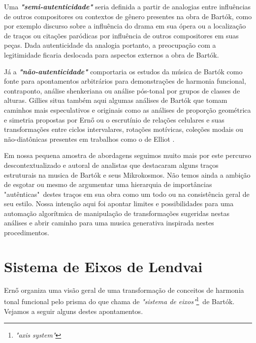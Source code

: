 \documentclass[
	12pt,				%
	openright,			%
	twoside,			%
	a4paper,			%
	english,			%
	french,				%
	spanish,			%
	brazil				%
	]{abntex2}
\begin{document}
Uma \textit{\textbf{"semi-autenticidade"}} seria definida a partir de analogias entre influências de outros compositores ou contextos de gênero presentes na obra de Bartók, como por exemplo discurso sobre a influência do drama em sua ópera ou a localização de traços ou citações paródicas por influência de outros compositores em suas peças. Dada autenticidade da analogia portanto, a preocupação com a legitimidade ficaria deslocada para aspectos externos a obra de Bartók.

Já a \textit{\textbf{"não-autenticidade"}} comportaria os estudos da música de Bartók como fonte para apontamentos arbitrários para demonstrações de harmonia funcional, contraponto, análise shenkeriana ou análise pós-tonal por grupos de classes de alturas. Gillies situa também aqui algumas análises de Bartók que tomam caminhos mais especulativos e originais como as análises de proporção geométrica e simetria propostas por Ern{\H{o}}   ou o escrutínio de relações celulares e suas transformações entre ciclos intervalares, rotações motívicas, coleções modais ou não-diatônicas presentes em trabalhos como o de Elliot . 

Em nossa pequena amostra de abordagens seguimos muito mais por este percurso descontextualizado e autoral de analistas que destacaram alguns traços estruturais na musica de Bartók e seus Mikrokosmos. Não temos ainda a ambição de esgotar ou mesmo de argumentar uma hierarquia de importâncias "autênticas"\ destes traços em sua obra como um todo ou na consistência geral de seu estilo. Nossa intenção aqui foi apontar limites e possibilidades para uma automação algorítmica de manipulação de transformações sugeridas nestas análises e abrir caminho para uma musica generativa inspirada nestes procedimentos.

\section{Sistema de Eixos de Lendvai}
\label{lendvai_eixos}

Ern{\H{o}}  organiza uma visão geral de uma transformação de conceitos de harmonia tonal funcional pelo prisma do que chama de \textit{"sistema de eixos"}\footnote{\textit{"axis system"}}\ de Bartók. Vejamos a seguir alguns destes apontamentos. 

\end{document}

